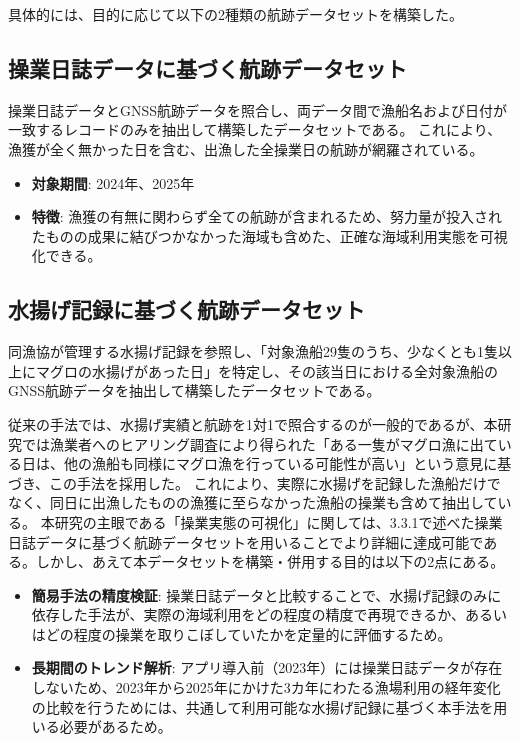 具体的には、目的に応じて以下の2種類の航跡データセットを構築した。

\subsection{操業日誌データに基づく航跡データセット}
操業日誌データとGNSS航跡データを照合し、両データ間で漁船名および日付が一致するレコードのみを抽出して構築したデータセットである。
これにより、漁獲が全く無かった日を含む、出漁した全操業日の航跡が網羅されている。
\begin{itemize}
  \item \textbf{対象期間}: 2024年、2025年
  \item \textbf{特徴}: 漁獲の有無に関わらず全ての航跡が含まれるため、努力量が投入されたものの成果に結びつかなかった海域も含めた、正確な海域利用実態を可視化できる。
\end{itemize}

\subsection{水揚げ記録に基づく航跡データセット}
同漁協が管理する水揚げ記録を参照し、「対象漁船29隻のうち、少なくとも1隻以上にマグロの水揚げがあった日」を特定し、その該当日における全対象漁船のGNSS航跡データを抽出して構築したデータセットである。

従来の手法では、水揚げ実績と航跡を1対1で照合するのが一般的であるが、本研究では漁業者へのヒアリング調査により得られた「ある一隻がマグロ漁に出ている日は、他の漁船も同様にマグロ漁を行っている可能性が高い」という意見に基づき、この手法を採用した。
これにより、実際に水揚げを記録した漁船だけでなく、同日に出漁したものの漁獲に至らなかった漁船の操業も含めて抽出している。
本研究の主眼である「操業実態の可視化」に関しては、3.3.1で述べた操業日誌データに基づく航跡データセットを用いることでより詳細に達成可能である。しかし、あえて本データセットを構築・併用する目的は以下の2点にある。

\begin{itemize}
  \item \textbf{簡易手法の精度検証}: 
  操業日誌データと比較することで、水揚げ記録のみに依存した手法が、実際の海域利用をどの程度の精度で再現できるか、あるいはどの程度の操業を取りこぼしていたかを定量的に評価するため。
  
  \item \textbf{長期間のトレンド解析}: 
  アプリ導入前（2023年）には操業日誌データが存在しないため、2023年から2025年にかけた3カ年にわたる漁場利用の経年変化の比較を行うためには、共通して利用可能な水揚げ記録に基づく本手法を用いる必要があるため。
\end{itemize}


